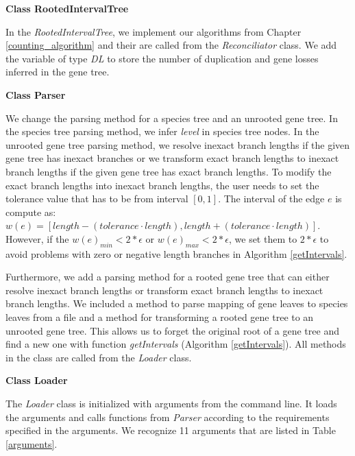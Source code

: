 \noindent \textbf{Class RootedIntervalTree}

In the \emph{RootedIntervalTree}, we implement our algorithms from Chapter \ref{counting_algorithm} and their are called from the \emph{Reconciliator} class. We add the variable of type \emph{DL} to store the number of duplication and gene losses inferred in the gene tree.

\noindent \textbf{Class Parser}

We change the parsing method for a species tree and an unrooted gene tree. In the species tree parsing method, we infer \emph{level} in species tree nodes. In the unrooted gene tree parsing method, we resolve inexact branch lengths if the given gene tree has inexact branches or we transform exact branch lengths to inexact branch lengths if the given gene tree has exact branch lengths. To modify the exact branch lengths into inexact branch lengths, the user needs to set the tolerance value that has to be from interval $[ 0, 1 ]$. The interval of the edge $e$ is compute as: $w(e) = [ length - (tolerance \cdot length), length + (tolerance \cdot length) ]$. However, if the $w(e)_{min} < 2*\epsilon$ or $w(e)_{max} < 2*\epsilon$, we set them to $2*\epsilon$ to avoid problems with zero or negative length branches in Algorithm \ref{getIntervals}. 

Furthermore, we add a parsing method for a rooted gene tree that can either resolve inexact branch lengths or transform exact branch lengths to inexact branch lengths. We included a method to parse mapping of gene leaves to species leaves from a file and a method for transforming a rooted gene tree to an unrooted gene tree. This allows us to forget the original root of a gene tree and find a new one with function \emph{getIntervals} (Algorithm \ref{getIntervals}). All methods in the class are called from the \emph{Loader} class.

\noindent \textbf{Class Loader}

The \emph{Loader} class is initialized with arguments from the command line. It loads the arguments and calls functions from \emph{Parser} according to the requirements specified in the arguments. We recognize 11 arguments that are listed in Table \ref{arguments}.

